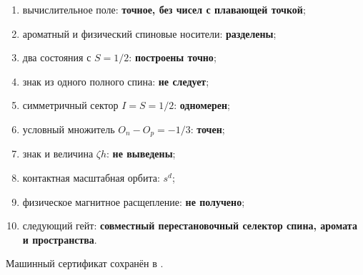 \begin{protocol}
\begin{enumerate}
 \item вычислительное поле: \textbf{точное, без чисел с плавающей точкой};
 \item ароматный и физический спиновые носители: \textbf{разделены};
 \item два состояния с $S=1/2$: \textbf{построены точно};
 \item знак из одного полного спина: \textbf{не следует};
 \item симметричный сектор $I=S=1/2$: \textbf{одномерен};
 \item условный множитель $O_n-O_p=-1/3$: \textbf{точен};
 \item знак и величина $\zeta h$: \textbf{не выведены};
 \item контактная масштабная орбита: \textbf{$s^d$};
 \item физическое магнитное расщепление: \textbf{не получено};
 \item следующий гейт: \textbf{совместный перестановочный селектор
 спина, аромата и пространства}.
\end{enumerate}
\end{protocol}

Машинный сертификат сохранён в
.